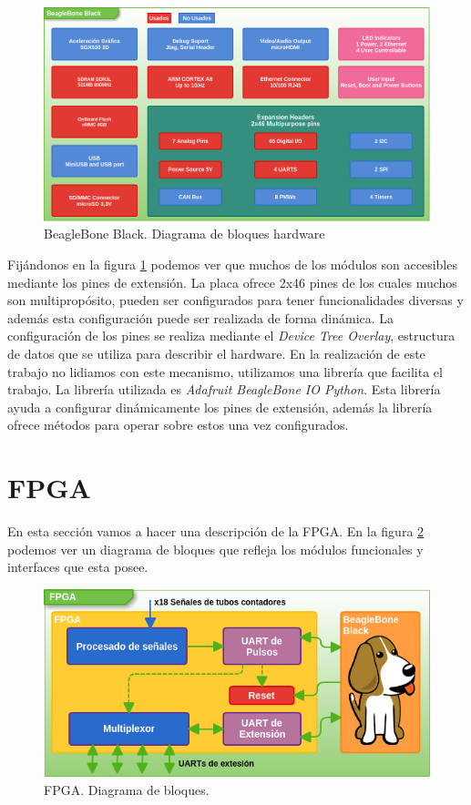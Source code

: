	\begin{figure}[h]
		\centering
		\includegraphics[keepaspectratio, width=1\textwidth]{./img/beaglebone.png}
		\caption{BeagleBone Black. Diagrama de bloques hardware}
		\label{fig:beaglebone}
	\end{figure}
	\par
	Fijándonos en la figura \ref{fig:beaglebone} podemos ver que muchos de los módulos son accesibles mediante los pines de
	extensión\cite{BeagleWikiExp}. La placa ofrece 2x46 pines de los cuales muchos son multipropósito, pueden ser configurados para tener
	funcionalidades diversas y además esta configuración puede ser realizada de forma dinámica. La configuración de los pines se realiza mediante
	el \emph{Device Tree Overlay}, estructura de datos que se utiliza para describir el hardware. En la realización de este trabajo no lidiamos
	con este mecanismo, utilizamos una librería que facilita el trabajo. La librería utilizada es \emph{Adafruit BeagleBone IO
	Python}\cite{AdaFruitGit}. Esta librería ayuda a configurar dinámicamente los pines de extensión, además la librería ofrece métodos para
	operar sobre estos una vez configurados.

\section{FPGA}
	En esta sección vamos a hacer una descripción de la FPGA. En la figura \ref{fig:fpga} podemos ver un diagrama de bloques que refleja los
	módulos funcionales y interfaces que esta posee.
	\begin{figure}[h]
		\centering
		\includegraphics[keepaspectratio, width=1\textwidth]{./img/fpga.png}
		\caption{FPGA. Diagrama de bloques.}
		\label{fig:fpga}
	\end{figure}	
